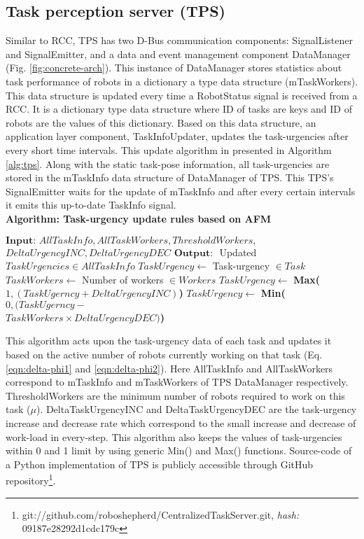 \subsection{Task perception server (TPS)}
Similar to RCC,  TPS has two D-Bus communication components: SignalListener and SignalEmitter, and a data and event management component DataManager (Fig. \ref{fig:concrete-arch}). This instance of DataManager stores statistics about task performance of robots in a dictionary a type data structure (mTaskWorkers). This data structure is updated every time a RobotStatus signal is received from a RCC. It is a dictionary type data structure where ID of tasks are keys and ID of robots are the values of this dictionary. Based on this data structure, an application layer component, TaskInfoUpdater, updates the task-urgencies after every short time intervals. This update algorithm in presented in Algorithm \ref{alg:tps}.  Along with the static task-pose information, all task-urgencies are stored in the mTaskInfo data structure of  DataManager of TPS. This TPS's SignalEmitter waits for the update of mTaskInfo and after every certain intervals it emits this up-to-date TaskInfo signal.\\
\textbf{Algorithm: Task-urgency update rules  based on AFM}
\begin{small}
\begin{algorithmic}[1]
\label{alg:tps}
\State $\textbf{Input: } AllTaskInfo, AllTaskWorkers, ThresholdWorkers,$\\ \hspace*{1cm}$DeltaUrgencyINC, DeltaUrgencyDEC$
\State $\textbf{Output: }$ Updated $TaskUrgencies \in AllTaskInfo$
\State $ TaskUrgency \gets  $ Task-urgency $\in Task$
\State $ TaskWorkers \gets  $   Number of workers $ \in Workers$
\State $ TaskUrgency \gets $ \textbf{Max(}$1, (TaskUgerncy + DeltaUrgencyINC)$\textbf{)}
\Else
\State $ TaskUrgency \gets $ \textbf{Min(}$0, (TaskUgerncy - $\\ \hspace*{5.3cm}$ TaskWorkers  \times DeltaUrgencyDEC)$\textbf{)}
\EndIf
\EndFor
\end{algorithmic}
\end{small}
This algorithm acts upon the task-urgency data of each task and updates it based on the active number of robots currently working on that task (Eq. \ref{eqn:delta-phi1} and \ref{eqn:delta-phi2}). Here AllTaskInfo and AllTaskWorkers  correspond to  mTaskInfo and mTaskWorkers of TPS DataManager respectively.  ThresholdWorkers are the minimum number of robots required to work on this task ($\mu$). DeltaTaskUrgencyINC and DeltaTaskUrgencyDEC are the task-urgency increase and decrease rate which correspond to the small increase and decrease of work-load in every-step. This algorithm also keeps the values of task-urgencies within 0 and 1 limit by using generic Min() and Max() functions. Source-code of a Python implementation of TPS is publicly accessible through GitHub repository\footnote{git://github.com/roboshepherd/CentralizedTaskServer.git,  \textit{hash:} 09187e28292d1cdc179c}.
